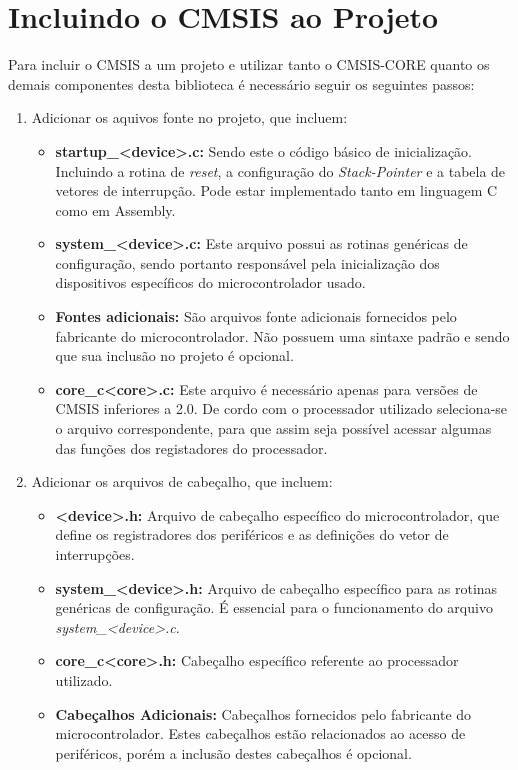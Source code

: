 \section{Incluindo o CMSIS ao Projeto}

Para incluir o CMSIS a um projeto e utilizar tanto  o CMSIS-CORE quanto os demais componentes desta biblioteca é necessário seguir os seguintes passos: 

\begin{enumerate}
	\item Adicionar os aquivos fonte no projeto, que incluem:
	\begin{itemize}
		\item \textbf{startup\_<device>.c:}  Sendo este o código básico de inicialização. Incluindo a rotina de \emph{reset}, a configuração do \emph{Stack-Pointer} e a tabela de vetores de interrupção. Pode estar implementado tanto em linguagem C como em Assembly.
		\item \textbf{system\_<device>.c:} Este arquivo possui as rotinas genéricas de configuração, sendo portanto responsável pela inicialização dos dispositivos específicos do microcontrolador usado.
		\item  \textbf{Fontes adicionais:} São arquivos fonte adicionais fornecidos pelo fabricante do microcontrolador. Não possuem uma sintaxe padrão e sendo que sua inclusão no projeto é opcional. 
		\item \textbf{core\_c<core>.c:} Este arquivo é necessário apenas para versões de CMSIS inferiores a 2.0. De cordo com o processador utilizado seleciona-se o arquivo correspondente, para que assim seja possível  acessar algumas das funções dos  registadores do processador.
	\end{itemize}
	
	\item Adicionar os arquivos de cabeçalho, que incluem:
	\begin{itemize}
		\item \textbf{<device>.h:} Arquivo de cabeçalho específico do microcontrolador, que define os registradores dos periféricos e as definições do vetor de interrupções.
		\item \textbf{system\_<device>.h:} Arquivo de cabeçalho específico para as rotinas genéricas de configuração. É essencial para o funcionamento do arquivo \emph{system\_<device>.c}.
		\item \textbf{core\_c<core>.h:} Cabeçalho específico referente ao processador utilizado.
		\item  \textbf{Cabeçalhos Adicionais:} Cabeçalhos fornecidos pelo fabricante do microcontrolador. Estes cabeçalhos estão relacionados ao acesso de periféricos, porém a inclusão destes cabeçalhos é opcional.
	\end{itemize}
\end{enumerate}

